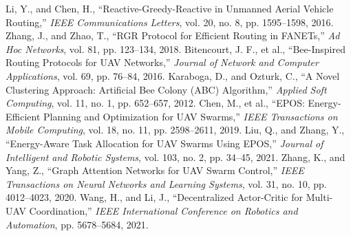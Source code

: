 \documentclass{article}
\begin{document}
\begin{thebibliography}{10}
 Li, Y., and Chen, H., ``Reactive-Greedy-Reactive in Unmanned Aerial Vehicle Routing,'' \textit{IEEE Communications Letters}, vol. 20, no. 8, pp. 1595--1598, 2016.
 Zhang, J., and Zhao, T., ``RGR Protocol for Efficient Routing in FANETs,'' \textit{Ad Hoc Networks}, vol. 81, pp. 123--134, 2018.
 Bitencourt, J. F., et al., ``Bee-Inspired Routing Protocols for UAV Networks,'' \textit{Journal of Network and Computer Applications}, vol. 69, pp. 76--84, 2016.
 Karaboga, D., and Ozturk, C., ``A Novel Clustering Approach: Artificial Bee Colony (ABC) Algorithm,'' \textit{Applied Soft Computing}, vol. 11, no. 1, pp. 652--657, 2012.
 Chen, M., et al., ``EPOS: Energy-Efficient Planning and Optimization for UAV Swarms,'' \textit{IEEE Transactions on Mobile Computing}, vol. 18, no. 11, pp. 2598--2611, 2019.
 Liu, Q., and Zhang, Y., ``Energy-Aware Task Allocation for UAV Swarms Using EPOS,'' \textit{Journal of Intelligent and Robotic Systems}, vol. 103, no. 2, pp. 34--45, 2021.
 Zhang, K., and Yang, Z., ``Graph Attention Networks for UAV Swarm Control,'' \textit{IEEE Transactions on Neural Networks and Learning Systems}, vol. 31, no. 10, pp. 4012--4023, 2020.
 Wang, H., and Li, J., ``Decentralized Actor-Critic for Multi-UAV Coordination,'' \textit{IEEE International Conference on Robotics and Automation}, pp. 5678--5684, 2021.

\end{thebibliography}
\end{document}
